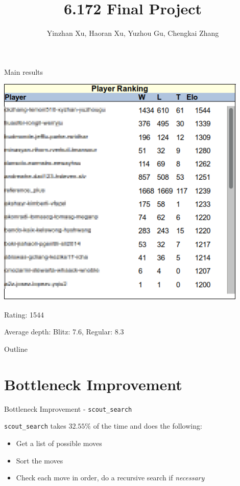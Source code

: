 \documentclass[10pt]{beamer}
\newcommand{\itema}{\item[*]}
\begin{document}
	\title{6.172 Final Project}
	\author{Yinzhan Xu, Haoran Xu, Yuzhou Gu, Chengkai Zhang}
	\date{}

	\begin{frame}
		\titlepage
	\end{frame}

	\begin{frame}{Main results}

        \begin{table}
        \begin{minipage}[b]{0.45\textwidth}
        \centering
        \includegraphics[width=0.9\textwidth]{screenshot2.png}

        Rating: 1544
        \end{minipage}
        \end{table}
        \centering
        Average depth: Blitz: 7.6, Regular: 8.3


	\end{frame}

    \begin{frame}{Outline}
    \tableofcontents
    \end{frame}

    \section{Bottleneck Improvement}
    \begin{frame}{Bottleneck Improvement - \tt{scout\_search}}

        {\tt scout\_search} takes $32.55\%$ of the time and does the following:
        \begin{itemize}
            \itema Get a list of possible moves
            \itema Sort the moves
            \itema Check each move in order, do a recursive search if {\it necessary}
        \end{itemize}
    \end{frame}
\end{document}
